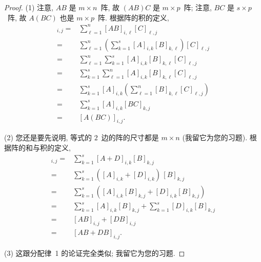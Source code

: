 \documentclass[../libro.tex]{subfiles}
\begin{document}
\begin{proof}
    (1)
    注意, \(AB\) 是 \(m \times n\)~阵,
    故 \((AB)C\) 是 \(m \times p\)~阵;
    注意, \(BC\) 是 \(s \times p\)~阵,
    故 \(A(BC)\) 也是 \(m \times p\)~阵.
    根据阵的积的定义,
    \begin{align*}
        [(AB)C]_{i,j}
        = {} &
        \sum_{\ell = 1}^{n} {[AB]_{i,\ell} [C]_{\ell,j}}
        \\
        = {} &
        \sum_{\ell = 1}^{n} {
            \left(\sum_{k = 1}^{s} {[A]_{i,k} [B]_{k,\ell}} \right)
        [C]_{\ell,j} }
        \\
        = {} &
        \sum_{\ell = 1}^{n} {
            \sum_{k = 1}^{s} {
        [A]_{i,k} [B]_{k,\ell} [C]_{\ell,j} }}
        \\
        = {} &
        \sum_{k = 1}^{s} {
            \sum_{\ell = 1}^{n} {
        [A]_{i,k} [B]_{k,\ell} [C]_{\ell,j}}}
        \\
        = {} &
        \sum_{k = 1}^{s} {
            [A]_{i,k}
            \left(
                \sum_{\ell = 1}^{n} {[B]_{k,\ell} [C]_{\ell,j}}
        \right) }
        \\
        = {} &
        \sum_{k = 1}^{s} {[A]_{i,k} [BC]_{k,j}}
        \\
        = {} &
        [A(BC)]_{i,j}.
    \end{align*}

    (2)
    您还是要先说明, 等式的 \(2\)~边的阵的尺寸都是 \(m \times n\)
    (我留它为您的习题).
    根据阵的和与积的定义,
    \begin{align*}
        [(A + D)B]_{i,j}
        = {} &
        \sum_{k = 1}^{s} {[A + D]_{i,k} [B]_{k,j}}
        \\
        = {} &
        \sum_{k = 1}^{s} {([A]_{i,k} + [D]_{i,k})\, [B]_{k,j}}
        \\
        = {} &
        \sum_{k = 1}^{s} {([A]_{i,k} [B]_{k,j}
        + [D]_{i,k} [B]_{k,j})}
        \\
        = {} &
        \sum_{k = 1}^{s} {[A]_{i,k} [B]_{k,j}}
        +
        \sum_{k = 1}^{s} {[D]_{i,k} [B]_{k,j}}
        \\
        = {} &
        [AB]_{i,j} + [DB]_{i,j}
        \\
        = {} &
        [AB + DB]_{i,j}.
    \end{align*}

    (3)
    这跟分配律~1 的论证完全类似;
    我留它为您的习题.


\end{proof}
\end{document}
